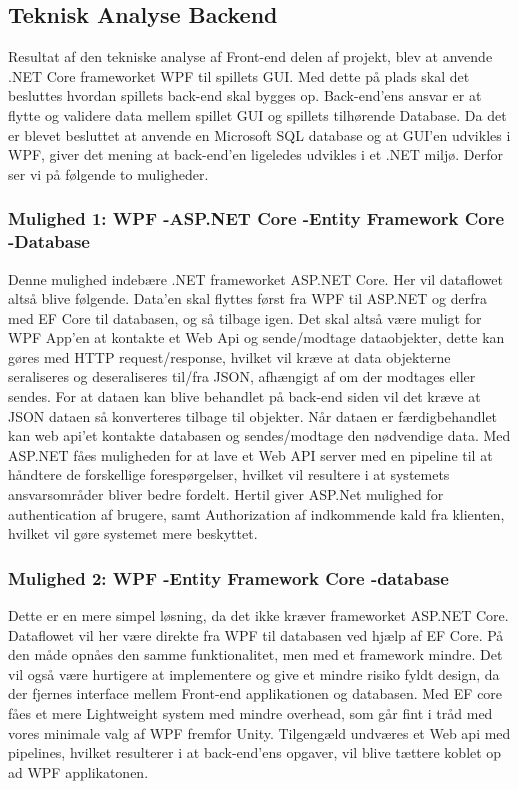 \subsection{Teknisk Analyse Backend}

Resultat af den tekniske analyse af Front-end delen af projekt, blev at anvende .NET Core frameworket WPF til spillets GUI. Med dette på plads skal det besluttes hvordan spillets back-end skal bygges op. Back-end’ens ansvar er at flytte og validere data mellem spillet GUI og spillets tilhørende Database. Da det er blevet besluttet at anvende en Microsoft SQL database og at GUI’en udvikles i WPF, giver det mening at back-end’en ligeledes udvikles i et .NET miljø. Derfor ser vi på følgende to muligheder.\\


\subsubsection{Mulighed 1: WPF -\g ASP.NET Core -\g Entity Framework Core -\g Database}
Denne mulighed indebære .NET frameworket ASP.NET Core. Her vil dataflowet altså blive følgende. Data’en skal flyttes først fra WPF til ASP.NET og derfra med EF Core til databasen, og så tilbage igen.
Det skal altså være muligt for WPF App’en at kontakte et Web Api og sende/modtage dataobjekter, dette kan gøres med HTTP request/response, hvilket vil kræve at data objekterne seraliseres og deseraliseres til/fra JSON, afhængigt af om der modtages eller sendes. For at dataen kan blive behandlet på back-end siden vil det kræve at JSON dataen så konverteres tilbage til objekter. Når dataen er færdigbehandlet kan web api’et kontakte databasen og sendes/modtage den nødvendige data. Med ASP.NET fåes muligheden for at lave et Web API server med en pipeline til at håndtere de forskellige forespørgelser, hvilket vil resultere i at systemets ansvarsområder bliver bedre fordelt. Hertil giver ASP.Net mulighed for authentication af brugere, samt Authorization af indkommende kald fra klienten, hvilket vil gøre systemet mere beskyttet. \\


\subsubsection{Mulighed 2: WPF -\g Entity Framework Core -\g database}

Dette er en mere simpel løsning, da det ikke kræver frameworket ASP.NET Core. Dataflowet vil her være direkte fra WPF til databasen ved hjælp af EF Core. På den måde opnåes den samme funktionalitet, men med et framework mindre. Det vil også være hurtigere at implementere og give et mindre risiko fyldt design, da der fjernes interface mellem Front-end applikationen og databasen. Med EF core fåes et mere Lightweight system med mindre overhead, som går fint i tråd med vores minimale valg af WPF fremfor Unity. Tilgengæld undværes et Web api med pipelines, hvilket resulterer i at back-end’ens opgaver, vil blive tættere koblet op ad WPF applikatonen.\\

